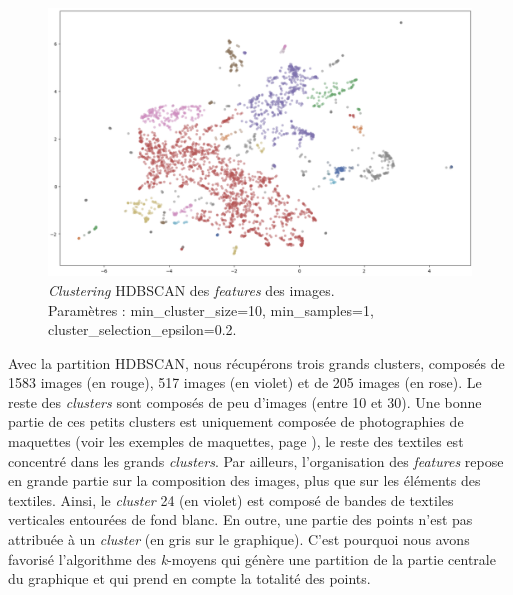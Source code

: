 \begin{figure}[!h]
	\begin{center}
		\includegraphics[width=16cm]{../images/YOLO_NS_HDBSCAN.png}
		\caption{\textit{Clustering} HDBSCAN des \textit{features} des images. \\ Paramètres :  min\_cluster\_size=10, min\_samples=1, cluster\_selection\_epsilon=0.2.}
	 \end{center}
\end{figure}

\noindent Avec la partition HDBSCAN, nous récupérons trois grands clusters, composés de 1583 images (en rouge), 517 images (en violet) et de 205 images (en rose). Le reste des \textit{clusters} sont composés de peu d'images (entre 10 et 30). Une bonne partie de ces petits clusters est uniquement composée de photographies de maquettes (voir les exemples de maquettes, page \pageref{fig:MEE004B}), le reste des textiles est concentré dans les grands \textit{clusters}. Par ailleurs, l'organisation des \textit{features} repose en grande partie sur la composition des images, plus que sur les éléments des textiles. Ainsi, le \textit{cluster} 24 (en violet) est composé de bandes de textiles verticales entourées de fond blanc. En outre, une partie des points n'est pas attribuée à un \textit{cluster} (en gris sur le graphique). C'est pourquoi nous avons favorisé l'algorithme des \textit{k}-moyens qui génère une partition de la partie centrale du graphique et qui prend en compte la totalité des points.

